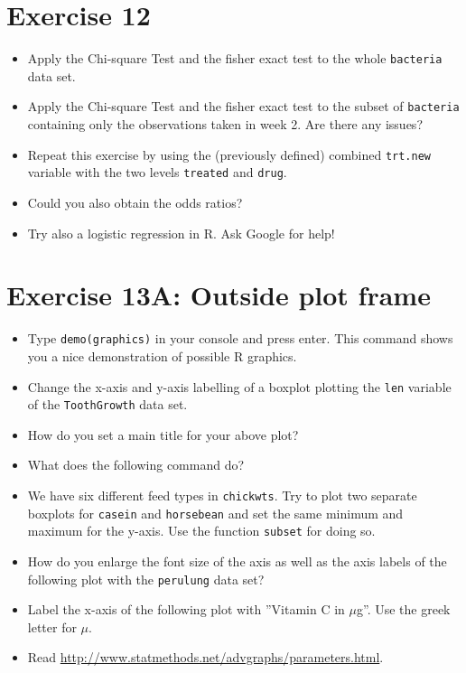 \documentclass[11pt]{article}\usepackage[]{graphicx}\usepackage[]{color}
\begin{document}
\section*{Exercise 12}
\begin{itemize}
\item Apply the Chi-square Test and the fisher exact test to the whole
\texttt{bacteria} data set.

\item Apply the Chi-square Test and the fisher exact test to the subset of
\texttt{bacteria} containing only the observations taken in week 2.
Are there any issues?

\item Repeat this exercise by using the (previously defined) combined
\texttt{trt.new} variable with the two levels \texttt{treated} and \texttt{drug}.

\item Could you also obtain the odds ratios?

\item Try also a logistic regression in R. Ask Google for help!

\end{itemize}
%
\section*{Exercise 13A: Outside plot frame}
\begin{itemize}
\item Type \texttt{demo(graphics)} in your console and press enter.
This command shows you a nice demonstration of possible R graphics.

\item Change the x-axis and y-axis labelling of a boxplot plotting the
\texttt{len} variable of the \texttt{ToothGrowth} data set.

\item How do you set a main title for your above plot?

\item What does the following command do?


%
\item We have six different feed types in \texttt{chickwts}. Try to plot two
separate boxplots for \texttt{casein} and \texttt{horsebean} and set the same
minimum and maximum for the y-axis. Use the function \texttt{subset} for doing so.


\item How do you enlarge the font size of the axis as well as the axis labels
of the following plot with the \texttt{perulung} data set?


\item Label the x-axis of the following plot with ''Vitamin C in $\mu$g''. Use the
greek letter for $\mu$.


\item Read \url{http://www.statmethods.net/advgraphs/parameters.html}.
\end{itemize}
\end{document}
